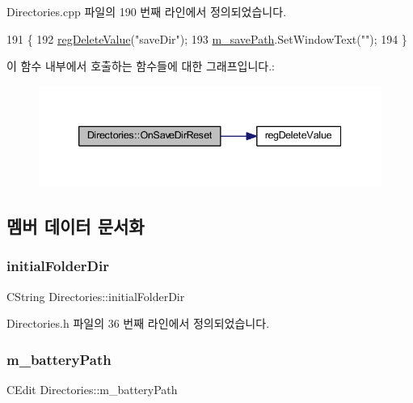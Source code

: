Directories.\+cpp 파일의 190 번째 라인에서 정의되었습니다.


\begin{DoxyCode}
191 \{
192   \mbox{\hyperlink{_reg_8cpp_aa7b7490d17e18a60838a58482114fd75}{regDeleteValue}}(\textcolor{stringliteral}{"saveDir"});
193   \mbox{\hyperlink{class_directories_a9293c8e99ad84e8a78d127ff09534d6c}{m\_savePath}}.SetWindowText(\textcolor{stringliteral}{""});  
194 \}
\end{DoxyCode}
이 함수 내부에서 호출하는 함수들에 대한 그래프입니다.\+:
\nopagebreak
\begin{figure}[H]
\begin{center}
\leavevmode
\includegraphics[width=339pt]{class_directories_aeb85866cbd498c057e9bf66b58a78959_cgraph}
\end{center}
\end{figure}


\subsection{멤버 데이터 문서화}
\mbox{\label{class_directories_a5f307fd959af44c194c520b5452cafba}} 
\subsubsection{\texorpdfstring{initial\+Folder\+Dir}{initialFolderDir}}
{\footnotesize\ttfamily C\+String Directories\+::initial\+Folder\+Dir}



Directories.\+h 파일의 36 번째 라인에서 정의되었습니다.

\mbox{\label{class_directories_af8f18fc9d1fbcd0df0cba4ec6fb862de}} 
\subsubsection{\texorpdfstring{m\+\_\+battery\+Path}{m\_batteryPath}}
{\footnotesize\ttfamily C\+Edit Directories\+::m\+\_\+battery\+Path}



